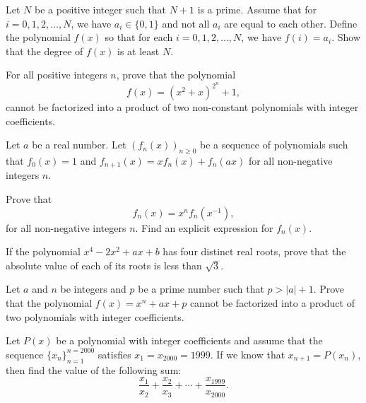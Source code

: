 \begin{question}[name={1998 India}]
    Let $N$ be a positive integer such that $N+1$ is a prime. Assume that for $i=0,1,2,\dots,N$, we have $a_i \in \{0,1\}$ and not all $a_i$ are equal to each other. Define the polynomial $f(x)$ so that for each $i=0,1,2,\dots,N$, we have $f(i)=a_i$. Show that the degree of $f(x)$ is at least $N$.
\end{question}



\begin{question}[name={1998 Romania}]
    For all positive integers $n$, prove that the polynomial
    \[f(x)=(x^2+x)^{2^n}+1,\]
    cannot be factorized into a product of two non-constant polynomials with integer coefficients.
\end{question}


\begin{question}[name={1999 China}]
    Let $a$ be a real number. Let $(f_n(x))_{n\ge 0}$ be a sequence of polynomials such that $f_0(x)=1$ and $f_{n+1}(x)=xf_n(x)+f_n(ax)$ for all non-negative integers $n$.
    \begin{tasks}
        \task Prove that \[f_n(x)=x^nf_n\left(x^{-1}\right),\] for all non-negative integers $n$.
        \task Find an explicit expression for $f_n(x)$.
    \end{tasks}
\end{question}


\begin{question}[name={1999 Hungary}]
    If the polynomial $x^4-2x^2+ax+b$ has four distinct real roots, prove that the absolute value of each of its roots is less than $\sqrt 3$.
\end{question}



\begin{question}[name={1999 Romania}]
    Let $a$ and $n$ be integers and $p$ be a prime number such that $p>|a|+1$. Prove that the polynomial $f(x)=x^n+ax+p$ cannot be factorized into a product of two polynomials with integer coefficients.
\end{question}



\begin{question}[name={1999 Ukraine}]
    Let $P(x)$ be a polynomial with integer coefficients and assume that the sequence $\{x_n\}_{n=1}^{n=2000}$ satisfies $x_1=x_{2000}=1999$. If we know that $x_{n+1}=P(x_n)$, then find the value of the following sum:
    \[\frac{x_1}{x_2}+\frac{x_2}{x_3}+\cdots+\frac{x_{1999}}{x_{2000}}.\]
\end{question}




